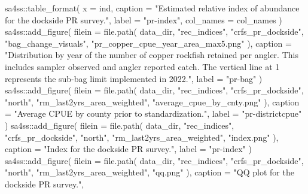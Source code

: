 \documentclass[
  letterpaper,
]{article}
\newenvironment{Shaded}{\begin{snugshade}}{\end{snugshade}}
\newcommand{\AttributeTok}[1]{\textcolor[rgb]{0.77,0.63,0.00}{#1}}
\newcommand{\FunctionTok}[1]{\textcolor[rgb]{0.00,0.00,0.00}{#1}}
\newcommand{\NormalTok}[1]{#1}
\newcommand{\SpecialCharTok}[1]{\textcolor[rgb]{0.00,0.00,0.00}{#1}}
\newcommand{\StringTok}[1]{\textcolor[rgb]{0.31,0.60,0.02}{#1}}
\begin{document}
\begin{Shaded}
\begin{Highlighting}[]
\NormalTok{sa4ss}\SpecialCharTok{::}\FunctionTok{table\_format}\NormalTok{(}
  \AttributeTok{x =}\NormalTok{ ind,}
  \AttributeTok{caption =} \StringTok{"Estimated relative index of abundance for the dockside PR survey."}\NormalTok{,}
  \AttributeTok{label =} \StringTok{"pr{-}index"}\NormalTok{,}
  \AttributeTok{col\_names =}\NormalTok{ col\_names}
\NormalTok{)}
\NormalTok{sa4ss}\SpecialCharTok{::}\FunctionTok{add\_figure}\NormalTok{(}
  \AttributeTok{filein =} \FunctionTok{file.path}\NormalTok{(}
\NormalTok{    data\_dir, }\StringTok{"rec\_indices"}\NormalTok{, }\StringTok{"crfs\_pr\_dockside"}\NormalTok{, }\StringTok{"bag\_change\_visuals"}\NormalTok{,}
    \StringTok{"pr\_copper\_cpue\_year\_area\_max5.png"}
\NormalTok{  ),}
  \AttributeTok{caption =} \StringTok{"Distribution by year of the number of copper rockfish retained per angler. }
\StringTok{  This includes sampler observed and angler reported catch. The vertical line at 1 represents the sub{-}bag }
\StringTok{  limit implemented in 2022."}\NormalTok{,}
  \AttributeTok{label =} \StringTok{"pr{-}bag"}
\NormalTok{)}
\NormalTok{sa4ss}\SpecialCharTok{::}\FunctionTok{add\_figure}\NormalTok{(}
  \AttributeTok{filein =} \FunctionTok{file.path}\NormalTok{(}
\NormalTok{    data\_dir, }\StringTok{"rec\_indices"}\NormalTok{, }\StringTok{"crfs\_pr\_dockside"}\NormalTok{, }\StringTok{"north"}\NormalTok{, }\StringTok{"rm\_last2yrs\_area\_weighted"}\NormalTok{,}
    \StringTok{"average\_cpue\_by\_cnty.png"}
\NormalTok{  ),}
  \AttributeTok{caption =} \StringTok{"Average CPUE by county prior to standardization."}\NormalTok{,}
  \AttributeTok{label =} \StringTok{"pr{-}districtcpue"}
\NormalTok{)}
\NormalTok{sa4ss}\SpecialCharTok{::}\FunctionTok{add\_figure}\NormalTok{(}
  \AttributeTok{filein =} \FunctionTok{file.path}\NormalTok{(}
\NormalTok{    data\_dir, }\StringTok{"rec\_indices"}\NormalTok{, }\StringTok{"crfs\_pr\_dockside"}\NormalTok{, }\StringTok{"north"}\NormalTok{, }\StringTok{"rm\_last2yrs\_area\_weighted"}\NormalTok{,}
    \StringTok{"index.png"}
\NormalTok{  ),}
  \AttributeTok{caption =} \StringTok{"Index for the dockside PR survey."}\NormalTok{,}
  \AttributeTok{label =} \StringTok{"pr{-}index"}
\NormalTok{)}
\NormalTok{sa4ss}\SpecialCharTok{::}\FunctionTok{add\_figure}\NormalTok{(}
  \AttributeTok{filein =} \FunctionTok{file.path}\NormalTok{(}
\NormalTok{    data\_dir, }\StringTok{"rec\_indices"}\NormalTok{, }\StringTok{"crfs\_pr\_dockside"}\NormalTok{, }\StringTok{"north"}\NormalTok{,}
    \StringTok{"rm\_last2yrs\_area\_weighted"}\NormalTok{, }\StringTok{"qq.png"}
\NormalTok{  ),}
  \AttributeTok{caption =} \StringTok{"QQ plot for the dockside PR survey."}\NormalTok{,}

\end{Highlighting}
\end{Shaded}
\end{document}
